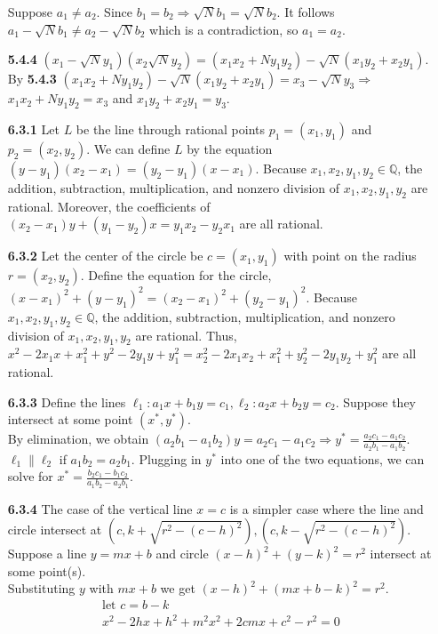 \documentclass[10pt]{article}
\begin{document}
\begin{enumerate}
    Suppose $a_1\neq a_2$. 
    Since $b_1=b_2\Rightarrow \sqrt{N}b_1=\sqrt{N}b_2$. 
    It follows $a_1-\sqrt{N}b_1\neq a_2-\sqrt{N}b_2$ which is a contradiction, so $a_1=a_2$.
    \item [\textbf{5.4.4}] $(x_1-\sqrt{N}y_1)(x_2\sqrt{N}y_2)=(x_1x_2+Ny_1y_2)-\sqrt{N}(x_1y_2+x_2y_1)$. By \textbf{5.4.3} $(x_1x_2+Ny_1y_2)-\sqrt{N}(x_1y_2+x_2y_1)=x_3-\sqrt{N}y_3\Rightarrow$ $x_1x_2+Ny_1y_2=x_3$ and $x_1y_2+x_2y_1=y_3$.
    \item [\textbf{6.3.1}] Let $L$ be the line through rational points $p_1=(x_1,y_1)$ and $p_2=(x_2,y_2)$. 
    We can define $L$ by the equation $(y-y_1)(x_2-x_1)=(y_2-y_1)(x-x_1)$.
    Because $x_1,x_2,y_1,y_2\in\mathbb{Q}$, the addition, subtraction, multiplication, and nonzero division of $x_1,x_2,y_1,y_2$ are rational. 
    Moreover, the coefficients of $(x_2-x_1)y+(y_1-y_2)x=y_1x_2-y_2x_1$ are all rational.
    \item [\textbf{6.3.2}] Let the center of the circle be $c=(x_1,y_1)$ with point on the radius $r=(x_2,y_2)$.
    Define the equation for the circle, ${(x-x_1)}^2+{(y-y_1)}^2={(x_2-x_1)}^2+{(y_2-y_1)}^2$.
    Because $x_1,x_2,y_1,y_2\in\mathbb{Q}$, the addition, subtraction, multiplication, and nonzero division of $x_1,x_2,y_1,y_2$ are rational. 
    Thus, $x^2-2x_1x+x_1^2+y^2-2y_1y+y_1^2=x_2^2-2x_1x_2+x_1^2+y_2^2-2y_1y_2+y_1^2$ are all rational.
    \item [\textbf{6.3.3}] Define the lines $\ell_1: a_1x+b_1y=c_1, \ell_2: a_2x+b_2y=c_2$. Suppose they intersect at some point $(x^*,y^*)$.\\
    By elimination, we obtain $(a_2b_1-a_1b_2)y=a_2c_1-a_1c_2\Rightarrow y^*=\frac{a_2c_1-a_1c_2}{a_2b_1-a_1b_2}$. $\ell_1\parallel\ell_2$ if $a_1b_2=a_2b_1$. 
    Plugging in $y^*$ into one of the two equations, we can solve for $x^*=\frac{b_2c_1-b_1c_2}{a_1b_2-a_2b_1}$.
    \item [\textbf{6.3.4}] The case of the vertical line $x=c$ is a simpler case where the line and circle intersect at $(c,k+\sqrt{r^2-{(c-h)}^2}),(c,k-\sqrt{r^2-{(c-h)}^2})$.\\
    Suppose a line $y=mx+b$ and circle ${(x-h)}^2+{(y-k)}^2=r^2$ intersect at some point(s).\\
    Substituting $y$ with $mx+b$ we get ${(x-h)}^2+{(mx+b-k)}^2=r^2$.\\
    \begin{align*}
       \text{let }c=b-k\\
       x^2-2hx+h^2+m^2x^2+2cmx+c^2-r^2=0\\

\end{align*}
\end{enumerate}
\end{document}
